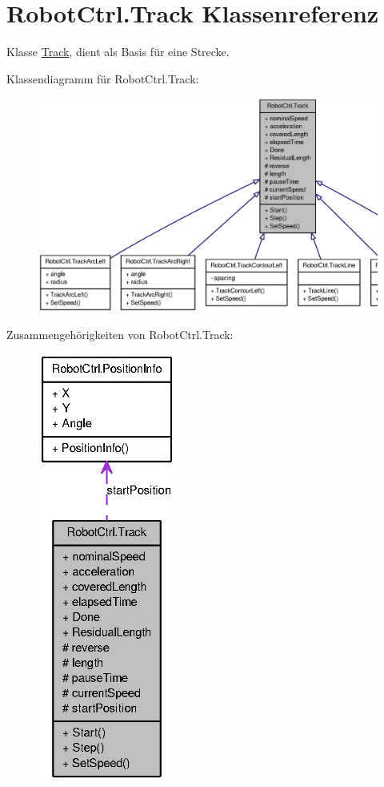 \hypertarget{class_robot_ctrl_1_1_track}{
\section{RobotCtrl.Track Klassenreferenz}
\label{class_robot_ctrl_1_1_track}
}


Klasse \hyperlink{class_robot_ctrl_1_1_track}{Track}, dient als Basis f\"{u}r eine Strecke.  




Klassendiagramm für RobotCtrl.Track:\nopagebreak
\begin{figure}[H]
\begin{center}
\leavevmode
\includegraphics[width=400pt]{class_robot_ctrl_1_1_track__inherit__graph}
\end{center}
\end{figure}


Zusammengehörigkeiten von RobotCtrl.Track:\nopagebreak
\begin{figure}[H]
\begin{center}
\leavevmode
\includegraphics[height=400pt]{class_robot_ctrl_1_1_track__coll__graph}
\end{center}
\end{figure}

